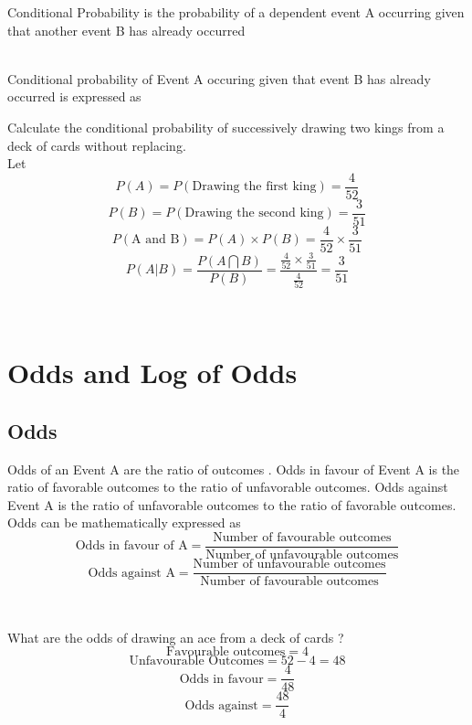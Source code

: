 \documentclass[twoside,12pt]{report}  %
\begin{document}
\begin{tcolorbox}[colback=red!5!white, colframe=red!75!black, title = \textbf{Conditional Probability}]
	Conditional Probability is the probability of a dependent event A occurring given that another event B has already occurred
\end{tcolorbox}
\noindent
\\
Conditional probability of Event A occuring given that event B has already occurred is expressed as
\begin{center}
\end{center}

\begin{tcolorbox}[colback=blue!5!white, colframe=blue!75!black, title = \textbf{Conditional Probability}]
	Calculate the conditional probability of successively drawing two kings from a deck of cards without replacing.
	\\
	Let
	$$ P(A) = P(\mbox{Drawing the first king}) = \frac{4}{52} $$
	$$ P(B) = P(\mbox{Drawing the second king}) = \frac{3}{51} $$
	$$ P(\mbox{A and B}) = P(A) \times P(B) = \frac{4}{52} \times \frac{3}{51} $$
	$$ P(A|B) = \frac{P(A \bigcap B)}{P(B)} = \frac{\frac{4}{52} \times \frac{3}{51}}{\frac{4}{52}} = \frac{3}{51} $$
\end{tcolorbox}
\noindent
\\
\section{Odds and Log of Odds}

\subsection{Odds}
\begin{tcolorbox}[colback=red!5!white, colframe=red!75!black, title = \textbf{Odds}]
	Odds of an Event A are the ratio of outcomes . Odds in favour of Event A is the ratio of favorable outcomes to the ratio of unfavorable outcomes. Odds against Event A is the ratio of unfavorable outcomes to the ratio of favorable outcomes. Odds can be mathematically expressed as
	$$ \mbox{Odds in favour of A} = \frac{\mbox{Number of favourable outcomes}}{\mbox{Number of unfavourable outcomes}} $$ 
	$$ \mbox{Odds against A} = \frac{\mbox{Number of unfavourable outcomes}}{\mbox{Number of favourable outcomes}} $$ 
\end{tcolorbox}
\noindent
\\
\begin{tcolorbox}[colback=blue!5!white, colframe=blue!75!black, title = \textbf{Odds}]
	What are the odds of drawing an ace from a deck of cards ?
	$$ \mbox{Favourable outcomes} = 4 $$
	$$ \mbox{Unfavourable Outcomes} = 52 - 4 = 48 $$
	$$ \mbox{Odds in favour} = \frac{4}{48} $$
	$$ \mbox{Odds against} = \frac{48}{4} $$
\end{tcolorbox}
\noindent
\\
\end{document}
